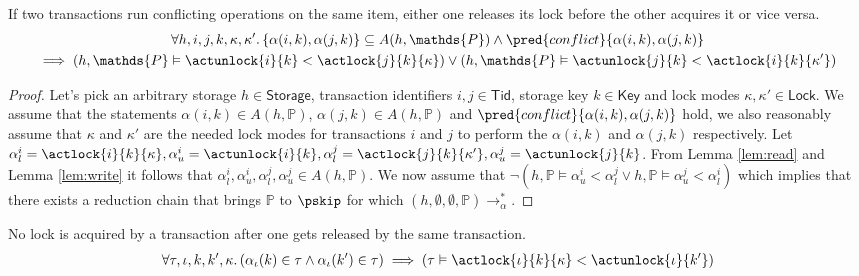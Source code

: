 \lem If two transactions run conflicting operations on the same item, either one releases its lock before the other acquires it or vice versa.
\begin{gather*}
\forall h, i, j, k, \kappa, \kappa' \ldotp 
\{ \alpha(i, k), \alpha(j, k) \} \subseteq A(h, \mathds{P}) \land \pred{conflict}{\alpha(i, k), \alpha(j, k)} 
\\
\implies \left( h, \mathds{P} \vDash \actunlock{i}{k} < \actlock{j}{k}{\kappa} \right) \lor \left( h, \mathds{P} \vDash \actunlock{j}{k} < \actlock{i}{k}{\kappa'} \right)
\end{gather*}

\begin{proof}
Let's pick an arbitrary storage $h \in \mathsf{Storage}$, transaction identifiers $i, j \in \mathsf{Tid}$, storage key $k \in \mathsf{Key}$ and lock modes $\kappa, \kappa' \in \mathsf{Lock}$. We assume that the statements $\alpha(i, k) \in A(h, \mathds{P})$, $\alpha(j, k) \in A(h, \mathds{P})$ and $\pred{conflict}{\alpha(i, k), \alpha(j, k)}$ hold, we also reasonably assume that $\kappa$ and $\kappa'$ are the needed lock modes for transactions $i$ and $j$ to perform the $\alpha(i, k)$ and $\alpha(j, k)$ respectively. Let $\alpha_l^i = \actlock{i}{k}{\kappa}, \alpha_u^i = \actunlock{i}{k}, \alpha_l^j = \actlock{j}{k}{\kappa'}, \alpha_u^j = \actunlock{j}{k}$. From Lemma \ref{lem:read} and Lemma \ref{lem:write} it follows that $\alpha_l^i, \alpha_u^i, \alpha_l^j, \alpha_u^j \in A(h, \mathds{P})$. We now assume that $\lnot \left( h, \mathds{P} \vDash \alpha_u^i < \alpha_l^j  \lor h, \mathds{P} \vDash \alpha_u^j < \alpha_l^i \right)$ which implies that there exists a reduction chain that brings $\mathds{P}$ to $\pskip$ for which $(h, \emptyset, \emptyset, \mathds{P}) \rightarrow^*_{\alpha}$.
\end{proof}

\lem No lock is acquired by a transaction after one gets released by the same transaction.
\begin{gather*}
\forall \tau, \iota, k, k', \kappa \ldotp 
\left( \alpha_\iota(k) \in \tau \land \alpha_\iota(k') \in \tau \right)
\implies \left( \tau \vDash \actlock{\iota}{k}{\kappa} < \actunlock{\iota}{k'} \right)
\end{gather*}

